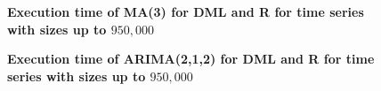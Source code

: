 \begin{figure}[ht]
	\centering
	\caption{\textbf{Execution time of MA(3) for DML and R for time series with sizes \textbf{up to $950,000$} }}
    \label{fig:ma3-exectime-scatter-all_reduced-regression}
\end{figure}

\begin{figure}[ht]
	\centering
	\caption{\textbf{Execution time of ARIMA(2,1,2) for DML and R for time series with sizes \textbf{up to $950,000$} }}
    \label{fig:arima212-exectime-scatter-all-regression}
\end{figure}


